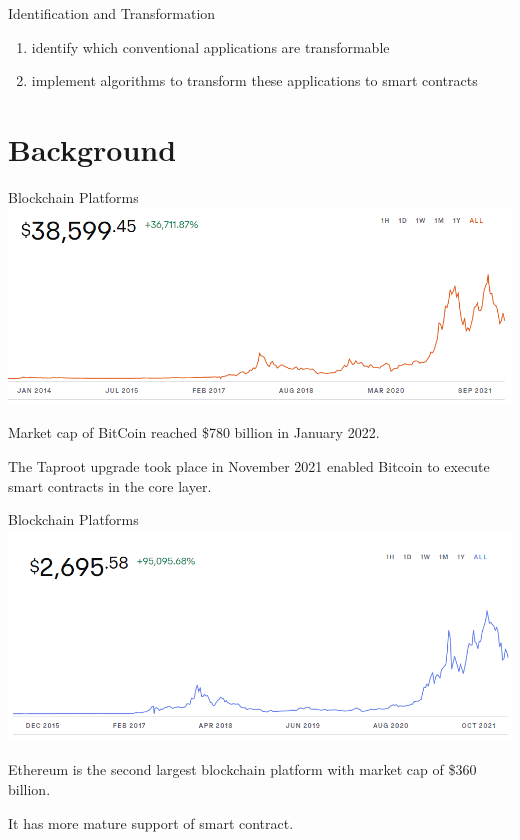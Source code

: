 \documentclass[xcolor=svgnames]{beamer}
\begin{document}
\begin{frame}{Identification and Transformation}

\begin{enumerate}
\item identify which conventional applications are transformable

\item implement algorithms to transform these applications to smart contracts
\end{enumerate}
\end{frame}


\section{Background}
\begin{frame}[t]{Blockchain Platforms}
\includegraphics[width=0.9\linewidth]{bitcoin-price}

Market cap of BitCoin reached \$780 billion in January 2022.

The Taproot upgrade took place in November 2021 enabled Bitcoin to execute smart contracts in the core layer.
\end{frame}

\begin{frame}[t]{Blockchain Platforms}
\includegraphics[width=0.9\linewidth]{ethereum-price}

Ethereum is the second largest blockchain platform with market cap of \$360 billion.

It has more mature support of smart contract.
\end{frame}
\end{document}

